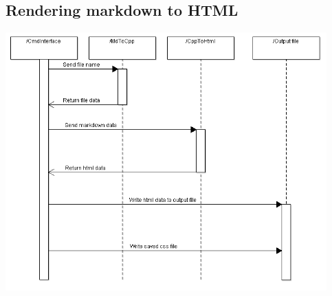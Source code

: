 \subsection{Rendering markdown to HTML}
\noindent\includegraphics[width=350pt]{images/mdToHtml_smaller.png}
